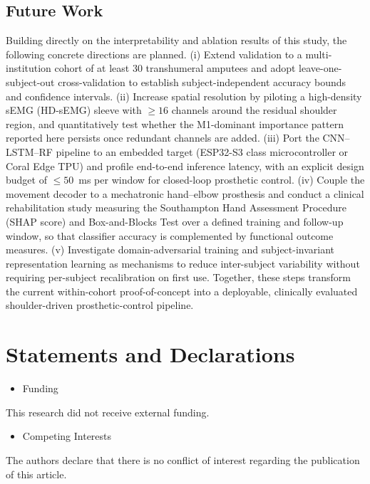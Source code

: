 \documentclass{elektr}
\newcommand{\yh}[1]{{\color{revhi}#1}}  %
\begin{document}
\subsection*{Future Work}
\yh{Building directly on the interpretability and ablation results of this study, the following concrete directions are planned. (i) Extend validation to a multi-institution cohort of at least 30 transhumeral amputees and adopt leave-one-subject-out cross-validation to establish subject-independent accuracy bounds and confidence intervals. (ii) Increase spatial resolution by piloting a high-density sEMG (HD-sEMG) sleeve with $\ge 16$ channels around the residual shoulder region, and quantitatively test whether the M1-dominant importance pattern reported here persists once redundant channels are added. (iii) Port the CNN--LSTM--RF pipeline to an embedded target (ESP32-S3 class microcontroller or Coral Edge TPU) and profile end-to-end inference latency, with an explicit design budget of $\le 50$~ms per window for closed-loop prosthetic control. (iv) Couple the movement decoder to a mechatronic hand--elbow prosthesis and conduct a clinical rehabilitation study measuring the Southampton Hand Assessment Procedure (SHAP score) and Box-and-Blocks Test over a defined training and follow-up window, so that classifier accuracy is complemented by functional outcome measures. (v) Investigate domain-adversarial training and subject-invariant representation learning as mechanisms to reduce inter-subject variability without requiring per-subject recalibration on first use. Together, these steps transform the current within-cohort proof-of-concept into a deployable, clinically evaluated shoulder-driven prosthetic-control pipeline.}

\section{Statements and Declarations}
\begin{itemize}
	\item Funding
\end{itemize}
This research did not receive external funding.
\begin{itemize}
	\item Competing Interests
\end{itemize}
The authors declare that there is no conflict of interest regarding the publication of this article.
\end{document}
